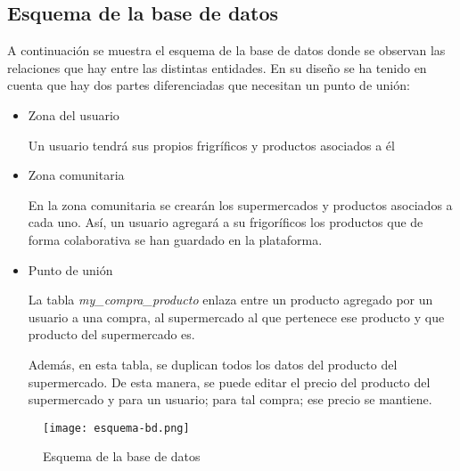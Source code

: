 \subsection{Esquema de la base de datos}

    A continuación se muestra el esquema de la base de datos donde se observan las relaciones que hay entre las distintas entidades. En su diseño se ha tenido en cuenta que hay dos partes diferenciadas que necesitan un punto de unión:

    \begin{itemize}
        \item Zona del usuario

            Un usuario tendrá sus propios frigríficos y productos asociados a él

        \item Zona comunitaria

            En la zona comunitaria se crearán los supermercados y productos asociados a cada uno. Así, un usuario agregará a su frigoríficos los productos que de forma colaborativa se han guardado en la plataforma.

        \item Punto de unión

            La tabla \emph{my\_compra\_producto} enlaza entre un producto agregado por un usuario a una compra, al supermercado al que pertenece ese producto y que producto del supermercado es.

            Además, en esta tabla, se duplican todos los datos del producto del supermercado. De esta manera, se puede editar el precio del producto del supermercado y para un usuario; para tal compra; ese precio se mantiene.
    \end{itemize}

\begin{figure}[H]
    \centering
    \texttt{[image: esquema-bd.png]}
    \caption{Esquema de la base de datos}\label{fig:esquema-bd}
\end{figure}
